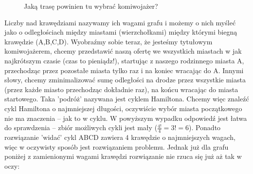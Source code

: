 \documentclass[a4paper]{article}
\theoremstyle{defn}
\theoremstyle{theorem}
\theoremstyle{lemma}
\theoremstyle{cor}
\theoremstyle{fact}
\begin{document}
\begin{figure}[h]
\begin{center}
\caption{Jaką trasę powinien tu wybrać komiwojażer?}
\end{center}
\end{figure}

Liczby nad krawędziami nazywamy ich wagami grafu i możemy o nich myśleć jako o odległościach między miastami (wierzchołkami) między którymi biegną krawędzie (A,B,C,D). Wyobraźmy sobie teraz, że jesteśmy tytułowym komiwojażerem, chcemy przedstawić naszą ofertę we wszystkich miastach w jak najkrótszym czasie (czas to pieniądz!), startując z naszego rodzinnego miasta A, przechodząc przez pozostałe miasta tylko raz i na koniec wracając do A. Innymi słowy, chcemy zminimalizować sumę odległości na drodze przez wszystkie miasta (przez każde miasto przechodząc dokładnie raz), na końcu wracając do miasta startowego. Taka 'podróż' nazywana jest cyklem Hamiltona. Chcemy więc znaleźć cykl Hamiltona o najmniejszej długości, oczywiście wybór miasta początkowego nie ma znaczenia – jak to w cyklu. W powyższym wypadku odpowiedź jest łatwa do sprawdzenia – zbiór możliwych cykli jest mały ($\frac{4!}{4} = 3! = 6$). Ponadto rozwiązanie 'widać' cykl ABCD zawiera 4 krawędzie o najmniejszych wagach, więc w oczywisty sposób jest rozwiązaniem problemu. Jednak już dla grafu poniżej z zamienionymi wagami krawędzi rozwiązanie nie rzuca się już aż tak w oczy:\\\\\\
\end{document}
